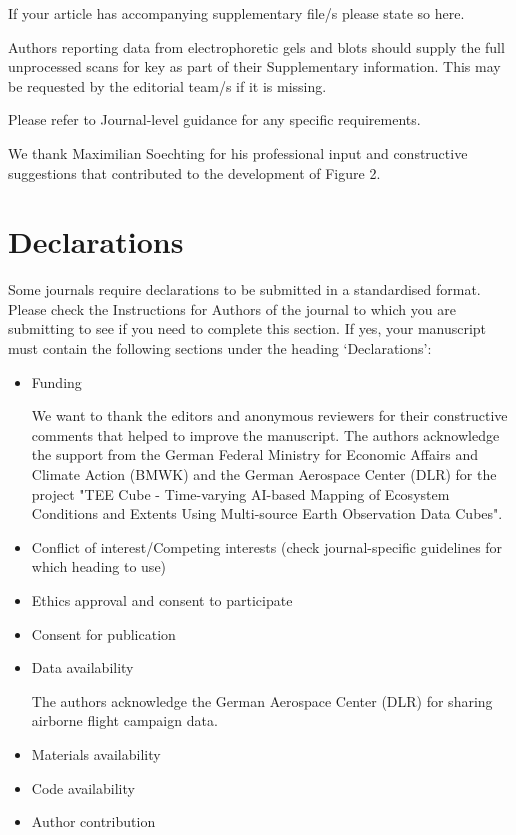\documentclass[pdflatex,sn-mathphys-num]{sn-jnl}%
\theoremstyle{thmstyleone}%
\theoremstyle{thmstyletwo}%
\theoremstyle{thmstylethree}%
\begin{document}



If your article has accompanying supplementary file/s please state so here. 

Authors reporting data from electrophoretic gels and blots should supply the full unprocessed scans for key as part of their Supplementary information. This may be requested by the editorial team/s if it is missing.

Please refer to Journal-level guidance for any specific requirements.


We thank Maximilian Soechting for his professional input and constructive suggestions that contributed to the development of Figure 2.

\section*{Declarations}

Some journals require declarations to be submitted in a standardised format. Please check the Instructions for Authors of the journal to which you are submitting to see if you need to complete this section. If yes, your manuscript must contain the following sections under the heading `Declarations':

\begin{itemize}
\item Funding


We want to thank the editors and anonymous reviewers for their constructive comments that helped to improve the manuscript. The authors acknowledge the support from the German Federal Ministry for Economic Affairs and Climate Action (BMWK) and the German Aerospace Center (DLR) for the project "TEE Cube - Time-varying AI-based Mapping of Ecosystem Conditions and Extents Using Multi-source Earth Observation Data Cubes".

\item Conflict of interest/Competing interests (check journal-specific guidelines for which heading to use)
\item Ethics approval and consent to participate
\item Consent for publication
\item Data availability 

The authors acknowledge the German Aerospace Center (DLR) for sharing airborne flight campaign data.


\item Materials availability
\item Code availability 
\item Author contribution
\end{itemize}

\noindent


\begin{appendices}
\section{}\label{secA1}
\end{appendices}


\end{document}
